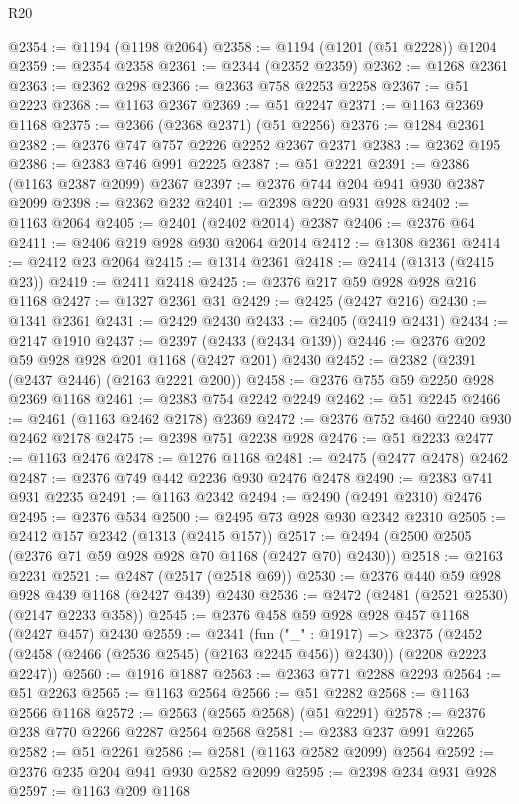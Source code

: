 \begin{lexlean}{R20}
\begin{coremodule}
@2354 := @1194 (@1198 @2064)
@2358 := @1194 (@1201 (@51 @2228)) @1204
@2359 := @2354 @2358
@2361 := @2344 (@2352 @2359)
@2362 := @1268 @2361
@2363 := @2362 @298
@2366 := @2363 @758 @2253 @2258
@2367 := @51 @2223
@2368 := @1163 @2367
@2369 := @51 @2247
@2371 := @1163 @2369 @1168
@2375 := @2366 (@2368 @2371) (@51 @2256)
@2376 := @1284 @2361
@2382 := @2376 @747 @757 @2226 @2252 @2367 @2371
@2383 := @2362 @195
@2386 := @2383 @746 @991 @2225
@2387 := @51 @2221
@2391 := @2386 (@1163 @2387 @2099) @2367
@2397 := @2376 @744 @204 @941 @930 @2387 @2099
@2398 := @2362 @232
@2401 := @2398 @220 @931 @928
@2402 := @1163 @2064
@2405 := @2401 (@2402 @2014) @2387
@2406 := @2376 @64
@2411 := @2406 @219 @928 @930 @2064 @2014
@2412 := @1308 @2361
@2414 := @2412 @23 @2064
@2415 := @1314 @2361
@2418 := @2414 (@1313 (@2415 @23))
@2419 := @2411 @2418
@2425 := @2376 @217 @59 @928 @928 @216 @1168
@2427 := @1327 @2361 @31
@2429 := @2425 (@2427 @216)
@2430 := @1341 @2361
@2431 := @2429 @2430
@2433 := @2405 (@2419 @2431)
@2434 := @2147 @1910
@2437 := @2397 (@2433 (@2434 @139))
@2446 := @2376 @202 @59 @928 @928 @201 @1168 (@2427 @201) @2430
@2452 := @2382 (@2391 (@2437 @2446) (@2163 @2221 @200))
@2458 := @2376 @755 @59 @2250 @928 @2369 @1168
@2461 := @2383 @754 @2242 @2249
@2462 := @51 @2245
@2466 := @2461 (@1163 @2462 @2178) @2369
@2472 := @2376 @752 @460 @2240 @930 @2462 @2178
@2475 := @2398 @751 @2238 @928
@2476 := @51 @2233
@2477 := @1163 @2476
@2478 := @1276 @1168
@2481 := @2475 (@2477 @2478) @2462
@2487 := @2376 @749 @442 @2236 @930 @2476 @2478
@2490 := @2383 @741 @931 @2235
@2491 := @1163 @2342
@2494 := @2490 (@2491 @2310) @2476
@2495 := @2376 @534
@2500 := @2495 @73 @928 @930 @2342 @2310
@2505 := @2412 @157 @2342 (@1313 (@2415 @157))
@2517 := @2494 (@2500 @2505 (@2376 @71 @59 @928 @928 @70 @1168 (@2427 @70) @2430))
@2518 := @2163 @2231
@2521 := @2487 (@2517 (@2518 @69))
@2530 := @2376 @440 @59 @928 @928 @439 @1168 (@2427 @439) @2430
@2536 := @2472 (@2481 (@2521 @2530) (@2147 @2233 @358))
@2545 := @2376 @458 @59 @928 @928 @457 @1168 (@2427 @457) @2430
@2559 := @2341
    (fun ("_" : @1917) =>
    @2375 (@2452 (@2458 (@2466 (@2536 @2545) (@2163 @2245 @456)) @2430)) (@2208 @2223 @2247))
@2560 := @1916 @1887
@2563 := @2363 @771 @2288 @2293
@2564 := @51 @2263
@2565 := @1163 @2564
@2566 := @51 @2282
@2568 := @1163 @2566 @1168
@2572 := @2563 (@2565 @2568) (@51 @2291)
@2578 := @2376 @238 @770 @2266 @2287 @2564 @2568
@2581 := @2383 @237 @991 @2265
@2582 := @51 @2261
@2586 := @2581 (@1163 @2582 @2099) @2564
@2592 := @2376 @235 @204 @941 @930 @2582 @2099
@2595 := @2398 @234 @931 @928
@2597 := @1163 @209 @1168

\end{coremodule}
\end{lexlean}
